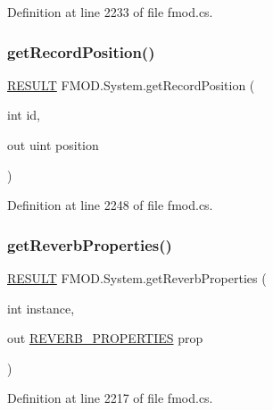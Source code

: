 Definition at line 2233 of file fmod.\+cs.

\mbox{\label{class_f_m_o_d_1_1_system_a90c460203b5cc70e1b1d32aac03a81b9}} 
\subsubsection{\texorpdfstring{get\+Record\+Position()}{getRecordPosition()}}
{\footnotesize\ttfamily \hyperlink{namespace_f_m_o_d_a305d1176ef3f8c8815861a60407ac33d}{R\+E\+S\+U\+LT} F\+M\+O\+D.\+System.\+get\+Record\+Position (\begin{DoxyParamCaption}\item[{int}]{id,  }\item[{out uint}]{position }\end{DoxyParamCaption})}



Definition at line 2248 of file fmod.\+cs.

\mbox{\label{class_f_m_o_d_1_1_system_aef855f81d2ed6a60532da40393d91c84}} 
\subsubsection{\texorpdfstring{get\+Reverb\+Properties()}{getReverbProperties()}}
{\footnotesize\ttfamily \hyperlink{namespace_f_m_o_d_a305d1176ef3f8c8815861a60407ac33d}{R\+E\+S\+U\+LT} F\+M\+O\+D.\+System.\+get\+Reverb\+Properties (\begin{DoxyParamCaption}\item[{int}]{instance,  }\item[{out \hyperlink{struct_f_m_o_d_1_1_r_e_v_e_r_b___p_r_o_p_e_r_t_i_e_s}{R\+E\+V\+E\+R\+B\+\_\+\+P\+R\+O\+P\+E\+R\+T\+I\+ES}}]{prop }\end{DoxyParamCaption})}



Definition at line 2217 of file fmod.\+cs.

\mbox{\label{class_f_m_o_d_1_1_system_a6125c6ba10048627c58faa4c62e0a04e}} 
